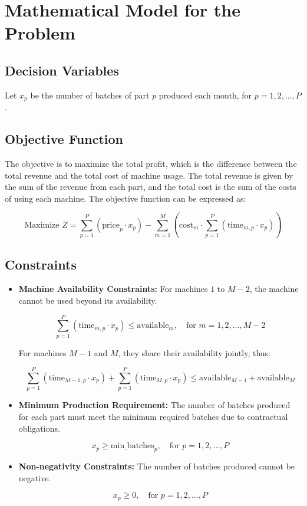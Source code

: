 \documentclass{article}
\begin{document}
\section*{Mathematical Model for the Problem}

\subsection*{Decision Variables}
Let $x_p$ be the number of batches of part $p$ produced each month, for $p = 1, 2, \ldots, P$.

\subsection*{Objective Function}
The objective is to maximize the total profit, which is the difference between the total revenue and the total cost of machine usage. The total revenue is given by the sum of the revenue from each part, and the total cost is the sum of the costs of using each machine. The objective function can be expressed as:

\[
\text{Maximize } Z = \sum_{p=1}^{P} (\text{price}_{p} \cdot x_p) - \sum_{m=1}^{M} (\text{cost}_{m} \cdot \sum_{p=1}^{P} (\text{time}_{m,p} \cdot x_p))
\]

\subsection*{Constraints}

\begin{itemize}
    \item \textbf{Machine Availability Constraints:} For machines $1$ to $M-2$, the machine cannot be used beyond its availability.

    \[
    \sum_{p=1}^{P} (\text{time}_{m,p} \cdot x_p) \leq \text{available}_{m}, \quad \text{for } m = 1, 2, \ldots, M-2
    \]

    For machines $M-1$ and $M$, they share their availability jointly, thus:

    \[
    \sum_{p=1}^{P} (\text{time}_{M-1,p} \cdot x_p) + \sum_{p=1}^{P} (\text{time}_{M,p} \cdot x_p) \leq \text{available}_{M-1} + \text{available}_{M}
    \]

    \item \textbf{Minimum Production Requirement:} The number of batches produced for each part must meet the minimum required batches due to contractual obligations.

    \[
    x_p \geq \text{min_batches}_{p}, \quad \text{for } p = 1, 2, \ldots, P
    \]

    \item \textbf{Non-negativity Constraints:} The number of batches produced cannot be negative.

    \[
    x_p \geq 0, \quad \text{for } p = 1, 2, \ldots, P
    \]

\end{itemize}
\end{document}
